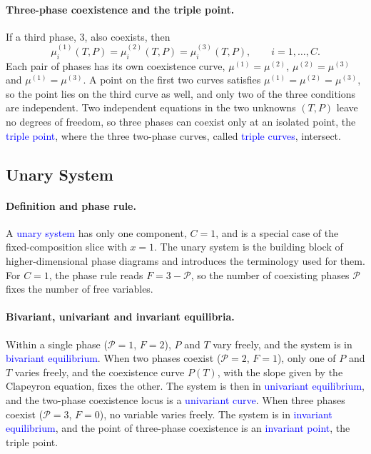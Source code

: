 \paragraph{Three-phase coexistence and the triple point.}
If a third phase, $3$, also coexists, then
\begin{equation*}
    \mu_i^{(1)}(T,P)=\mu_i^{(2)}(T,P)=\mu_i^{(3)}(T,P), \qquad i=1,\dots,C .
\end{equation*}
Each pair of phases has its own coexistence curve, $\mu^{(1)}=\mu^{(2)}$,
$\mu^{(2)}=\mu^{(3)}$ and $\mu^{(1)}=\mu^{(3)}$. A point on the first two
curves satisfies $\mu^{(1)}=\mu^{(2)}=\mu^{(3)}$, so the point lies on the
third curve as well, and only two of the three conditions are independent.
Two independent equations in the two unknowns $(T,P)$ leave no degrees of
freedom, so three phases can coexist only at an isolated point, the
\textcolor{blue}{triple point}, where the three two-phase curves, called
\textcolor{blue}{triple curves}, intersect.

\subsection{Unary System}
\label{sec:unary}

\paragraph{Definition and phase rule.}
A \textcolor{blue}{unary system} has only one component, $C=1$, and is a
special case of the fixed-composition slice with $x=1$. The unary system is
the building block of higher-dimensional phase diagrams and introduces the
terminology used for them. For $C=1$, the phase rule reads
$F = 3-\mathcal{P}$, so the number of coexisting phases $\mathcal{P}$ fixes
the number of free variables.

\paragraph{Bivariant, univariant and invariant equilibria.}
Within a single phase ($\mathcal{P}=1$, $F=2$), $P$ and $T$ vary freely,
and the system is in \textcolor{blue}{bivariant equilibrium}. When two
phases coexist ($\mathcal{P}=2$, $F=1$), only one of $P$ and $T$ varies
freely, and the coexistence curve $P(T)$, with the slope given by the
Clapeyron equation, fixes the other. The system is then in
\textcolor{blue}{univariant equilibrium}, and the two-phase coexistence
locus is a \textcolor{blue}{univariant curve}. When three phases coexist
($\mathcal{P}=3$, $F=0$), no variable varies freely. The system is in
\textcolor{blue}{invariant equilibrium}, and the point of three-phase
coexistence is an \textcolor{blue}{invariant point}, the triple point.


